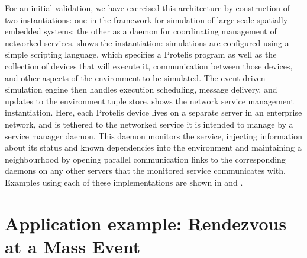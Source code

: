 \documentclass[12pt,a4paper,twoside,openright]{book}
\begin{document}
For an initial validation, we have exercised this architecture by construction of two instantiations: one in the \alchemist{} framework for simulation of large-scale spatially-embedded systems; the other as a daemon for coordinating management of networked services.
%
 shows the \alchemist{} instantiation: simulations are configured using a simple scripting language, which specifies a Protelis program as well as the collection of devices that will execute it, communication between those devices, and other aspects of the environment to be simulated.
%
The \alchemist{} event-driven simulation engine then handles execution scheduling, message delivery, and updates to the environment tuple store.
%
 shows the network service management instantiation.
%
Here, each Protelis device lives on a separate server in an enterprise network, and is tethered to the networked service it is intended to manage by a service manager daemon.
%
This daemon monitors the service, injecting information about its status and known dependencies into the environment and maintaining a neighbourhood by opening parallel communication links to the corresponding daemons on any other servers that the monitored service communicates with.
%
Examples using each of these implementations are shown in  and .

\section{Application example: Rendezvous at a Mass Event}
\label{protelis-rendezvous}
\end{document}
